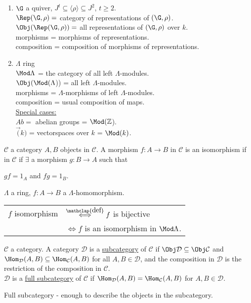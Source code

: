 \begin{exam}
\begin{enumerate}
\item $\G$ a quiver, $J^t \subseteq \langle \rho \rangle \subseteq J^2$, $t \geq 2$.\\
$\Rep(\G, \rho) = $ category of representations of $(\G, \rho)$.\\
$\Obj(\Rep(\G, \rho)) = $ all representations of $(\G, \rho)$ over $k$.\\
morphisms = morphisms of representations.\\
composition = composition of morphisms of representations.

\item $\Lambda$ ring\\
$\Mod\Lambda$ = the category of all left $\Lambda$-modules.\\
$\Obj(\Mod(\Lambda$)) = all left $\Lambda$-modules.\\
morphisms = $\Lambda$-morphisms of left $\Lambda$-modules.\\
composition = usual composition of maps.\\
\underline{Special cases:}\\
$Ab = $ abelian groups = $\Mod(\mathbb{Z}$).\\
$\Vec(k)$ = vectorspaces over $k$ = $\Mod(k)$.
\end{enumerate}
\end{exam}

\begin{defin}
$\mathcal{C}$ a category $A,B$ objects in $\mathcal{C}$. A morphism $f:A\to B$ in $\mathcal{C}$ is an isomorphism if in $\mathcal{C}$ if $\exists$ a morphism $g:B\to A$ such that\\
\centerline{$gf = 1_A$ and $fg=1_B$.}
\end{defin}
\begin{note}
$\Lambda$ a ring, $f:A\to B$ a $\Lambda$-homomorphism.\\
\begin{tabular}{cl}
$f$ isomorphism & $\stackrel{\mathclap{\normalfont\mbox{def}}}{\iff} f$ is bijective\\
& $\iff f$ is an isomorphism in $\Mod\Lambda$. 
\end{tabular}
\end{note}


\begin{defin}
$\mathcal{C}$ a category. A category $\mathcal{D}$ is a \underline{subcategory} of $\mathcal{C}$ if $\Obj\mathcal{D} \subseteq \Obj\mathcal{C}$ and $\Hom_\mathcal{D}(A,B) \subseteq \Hom_\mathcal{C}(A,B)$ for all $A,B \in \mathcal{D}$, and the composition in $\mathcal{D}$ is the restriction of the composition in $\mathcal{C}$.\\
$\mathcal{D}$ is a \underline{full subcategory} of $\mathcal{C}$ if $\Hom_\mathcal{D}(A,B) = \Hom_\mathcal{C}(A,B)$ for $A,B \in \mathcal{D}$.
\end{defin}
\begin{note}
Full subcategory - enough to describe the objects in the subcategory.
\end{note}

